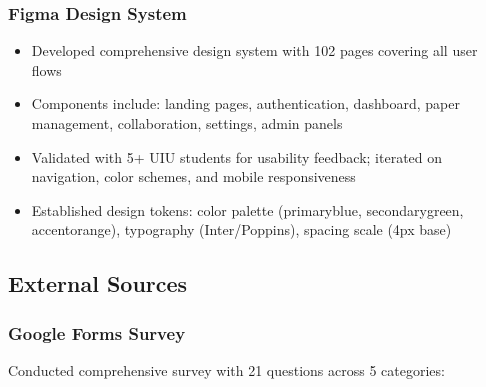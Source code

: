 \subsubsection{Figma Design System}

\begin{itemize}
    \item Developed comprehensive design system with 102 pages covering all user flows
    \item Components include: landing pages, authentication, dashboard, paper management, collaboration, settings, admin panels
    \item Validated with 5+ UIU students for usability feedback; iterated on navigation, color schemes, and mobile responsiveness
    \item Established design tokens: color palette (primaryblue, secondarygreen, accentorange), typography (Inter/Poppins), spacing scale (4px base)
\end{itemize}

\subsection{External Sources}

\subsubsection{Google Forms Survey}

Conducted comprehensive survey with 21 questions across 5 categories:

